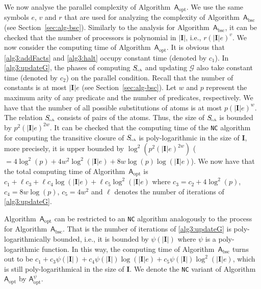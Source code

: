 We now analyse the parallel complexity of Algorithm~$\mathsf{A}_{\text{opt}}$.
We use the same symbols $e$, $v$ and $r$ that are used for analyzing the complexity of Algorithm~$\mathsf{A}_{\text{bsc}}$
(see Section~\ref{sec:alg-bsc}). Similarly to the analysis for Algorithm~$\mathsf{A}_{\text{bsc}}$, it can be checked that
the number of processors is polynomial in $|\textbf{I}|$, i.e., $r(|\textbf{I}|e)^v$.
We now consider the computing time of Algorithm~$\mathsf{A}_{\text{opt}}$. It
is obvious that \ref{alg3:addFacts} and
\ref{alg3:halt} occupy constant time (denoted by $c_1$). In \ref{alg3:updateG}, the phases of
computing $S_{\!\textit{\tiny rch}}$ and updating $\mathcal{G}$ also take constant time (denoted by $c_2$)
on the parallel condition. Recall that the number of constants is at most $|\textbf{I}|e$ (see Section~\ref{sec:alg-bsc}).
Let $w$ and $p$ represent the maximum arity of any predicate and the number of predicates, respectively.
We have that the number of all possible substitutions of atoms is at most $p(|\textbf{I}|e)^w$.
The relation $S_{\!\textit{\tiny rch}}$ consists of pairs of the atoms. Thus, the size of $S_{\!\textit{\tiny rch}}$
is bounded by $p^2(|\textbf{I}|e)^{2w}$. It can be checked that the computing time of the \texttt{NC} algorithm for computing the transitive
closure of $S_{\!\textit{\tiny rch}}$ is poly-logarithmic in the size of $\textbf{I}$, more precisely,
it is upper bounded by $\log^2(p^2(|\textbf{I}|e)^{2w})$ ($=4\log^2(p)+4w^2\log^2(|\textbf{I}|e)+8w\log(p)\log(|\textbf{I}|e)$).
We now have that the total computing time of
Algorithm~$\mathsf{A}_{\text{opt}}$ is $c_1+\ell c_3 + \ell
c_4\log(|\textbf{I}|e) +\ell c_5\log^2(|\textbf{I}|e)$
where $c_3=c_2+4\log^2(p)$, $c_4=8w\log(p)$, $c_5=4w^2$ and $\ell$ denotes the number of iterations of \ref{alg3:updateG}.

Algorithm~$\mathsf{A}_{\text{opt}}$ can be restricted to an \texttt{NC} algorithm analogously to the process
for Algorithm~$\mathsf{A}_{\text{bsc}}$. That is the number of iterations of \ref{alg3:updateG}
is poly-logarithmically bounded, i.e., it is bounded by $\psi(|\textbf{I}|)$
where $\psi$ is a poly-logarithmic function. In this way, the computing time of
Algorithm~$\mathsf{A}_{\text{bsc}}$ turns out to be $c_1+c_3\psi(|\textbf{I}|)+c_4\psi(|\textbf{I}|)\log(|\textbf{I}|e)+
c_5\psi(|\textbf{I}|)\log^2(|\textbf{I}|e)$,
which is still poly-logarithmical in the size of $\textbf{I}$. We denote the
\texttt{NC} variant of Algorithm~$\mathsf{A}_{\text{opt}}$ by $\mathsf{A}_{\text{opt}}^{\psi}$.

